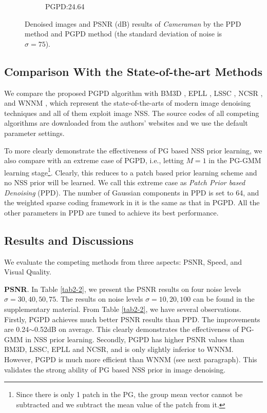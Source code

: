 \begin{figure}
\begin{subfigure}[t]{0.24\textwidth}
		\caption{PGPD:24.64}
    \end{subfigure}
    \caption{Denoised images and PSNR (dB) results of \textsl{Cameraman} by the PPD method and PGPD method (the standard deviation of noise is $\sigma=75$).}
    \label{fig2-9}
\end{figure}


\subsection{Comparison With the State-of-the-art Methods}
We compare the proposed PGPD algorithm with BM3D \cite{bm3d}, EPLL \cite{epll}, LSSC \cite{lssc}, NCSR \cite{ncsr}, and WNNM \cite{wnnm}, which represent the state-of-the-arts of modern image denoising techniques and all of them exploit image NSS. The source codes of all competing algorithms are downloaded from the authors' websites and we use the default parameter settings.  

To more clearly demonstrate the effectiveness of PG based NSS prior learning, we also compare with an extreme case of PGPD, i.e., letting $M=1$ in the PG-GMM learning stage\footnote{Since there is only 1 patch in the PG, the group mean vector cannot be subtracted and we subtract the mean value of the patch from it.}. Clearly, this reduces to a patch based prior learning scheme and no NSS prior will be learned. We call this extreme case as \textsl{Patch Prior based Denoising} (PPD).  The number of Gaussian components in PPD is set to 64, and the weighted sparse coding framework in it is the same as that in PGPD. All the other parameters in PPD are tuned to achieve its best performance.
\subsection{Results and Discussions}
We evaluate the competing methods from three aspects: PSNR, Speed, and Visual Quality.

\textbf{PSNR}. In Table \ref{tab2-2}, we present the PSNR results on four noise levels $\sigma=30,40,50,75$. The results on noise levels $\sigma=10,20,100$ can be found in the supplementary material. From Table \ref{tab2-2}, we have several observations. Firstly, PGPD achieves much better PSNR results than PPD. The improvements are 0.24$\sim$0.52dB on average. This clearly demonstrates the effectiveness of PG-GMM in NSS prior learning. Secondly, PGPD has higher PSNR values than BM3D, LSSC, EPLL and NCSR, and is only slightly inferior to WNNM. However, PGPD is much more efficient than WNNM (see next paragraph). This validates the strong ability of PG based NSS prior in image denoising. 

